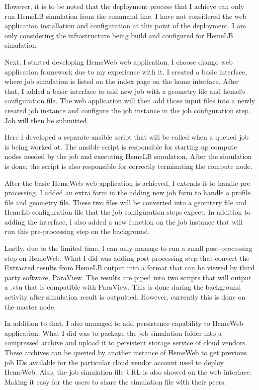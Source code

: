 However, it is to be noted that the deployment process that I achieve can only run HemeLB simulation from the command line. I have not considered the web application installation and configuration at this point of the deployment. I am only considering the infrastructure being build and configured for HemeLB simulation.


Next, I started developing HemeWeb web application. I choose django web application framework due to my experience with it. I created a basic interface, where job simulation is listed on the index page on the home interface. After that, I added a basic interface to add new job with a geometry file and hemelb configuration file. The web application will then add those input files into a newly created job instance and configure the job instance in the job configuration step. Job will then be submitted. 

Here I developed a separate ansible script that will be called when a queued job is being worked at. The ansible script is responsible for starting up compute nodes needed by the job and executing HemeLB simulation. After the simulation is done, the script is also responsible for correctly terminating the compute node.

After the basic HemeWeb web application is achieved, I extends it to handle pre-processing. I added an extra form in the adding new job form to handle a profile file and geometry file. These two files will be converted into a geomtery file and HemeLb configuration file that the job configuration steps expect. In addition to adding the interface, I also added a new function on the job instance that will run this pre-processing step on the background. 

Lastly, due to the limited time, I can only manage to run a small post-processing step on HemeWeb. What I did was adding post-processing step that convert the Extracted results from HemeLB output into a format that can be viewed by third party software, ParaView. The results are piped into two scripts that will output a .vtu that is compatible with ParaView. This is done during the background activity after simulation result is outputted. However, currently this is done on the master node.

In addition to that, I also managed to add persistence capability to HemeWeb application. What I did was to package the job simulation folder into a compressed archive and upload it to persistent storage service of cloud vendors. These archives can be queried by another instance of HemeWeb to get previous job IDs available for the particular cloud vendor account used to deploy HemeWeb.  Also, the job simulation file URL is also showed on the web interface. Making it easy for the users to share the simulation file with their peers.




